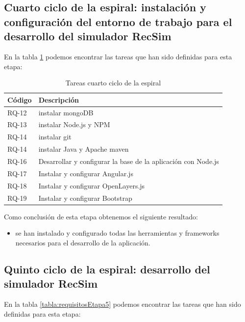 \subsection{Cuarto ciclo de la espiral: instalación y configuración del entorno de trabajo para el desarrollo del simulador RecSim}

En la tabla \ref{tabla:requisitosEtapa4} podemos encontrar las tareas que han sido definidas para esta etapa:

\begin{table}[H]
\begin{center}
\begin{tabular}{|p{1.5cm}| p{10.5cm}|}
\hline 
Código & Descripción \\
\hline \hline
RQ-12 & instalar mongoDB\\ \hline
RQ-13 & instalar Node.js y NPM\\ \hline
RQ-14 & instalar git\\ \hline
RQ-14 & instalar Java y Apache maven\\ \hline
RQ-16 & Desarrollar y configurar la base de la aplicación con Node.js\\ \hline
RQ-17 & Instalar y configurar Angular.js\\ \hline
RQ-18 & Instalar y configurar OpenLayers.js\\ \hline
RQ-19 & Instalar y configurar Bootstrap\\ \hline
\end{tabular}
\caption{Tareas cuarto ciclo de la espiral}
\label{tabla:requisitosEtapa4}
\end{center}
\end{table}

Como conclusión de esta etapa obtenemos el siguiente resultado:
\begin{itemize}
	\item se han instalado y configurado todas las herramientas y frameworks necesarios para el desarrollo de la aplicación.
\end{itemize}

\subsection{Quinto ciclo de la espiral: desarrollo del simulador RecSim}

En la tabla \ref{tabla:requisitosEtapa5} podemos encontrar las tareas que han sido definidas para esta etapa:

